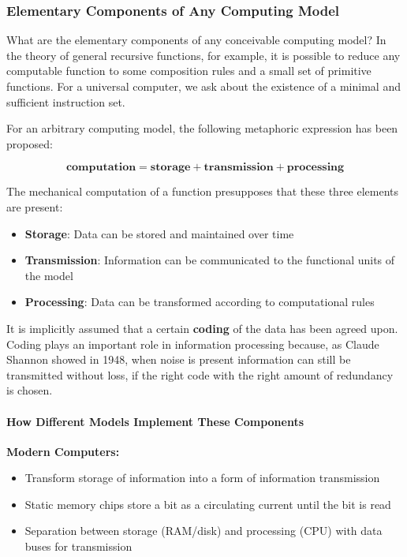 \subsubsection{Elementary Components of Any Computing Model}

What are the elementary components of any conceivable computing model? In the theory of general recursive functions, for example, it is possible to reduce any computable function to some composition rules and a small set of primitive functions. For a universal computer, we ask about the existence of a minimal and sufficient instruction set.

For an arbitrary computing model, the following metaphoric expression has been proposed:

\begin{equation}
\textbf{computation} = \textbf{storage} + \textbf{transmission} + \textbf{processing}
\end{equation}

The mechanical computation of a function presupposes that these three elements are present:

\begin{itemize}
\item \textbf{Storage}: Data can be stored and maintained over time
\item \textbf{Transmission}: Information can be communicated to the functional units of the model  
\item \textbf{Processing}: Data can be transformed according to computational rules
\end{itemize}

It is implicitly assumed that a certain \textbf{coding} of the data has been agreed upon. Coding plays an important role in information processing because, as Claude Shannon showed in 1948, when noise is present information can still be transmitted without loss, if the right code with the right amount of redundancy is chosen.

\paragraph{How Different Models Implement These Components}

\textbf{Modern Computers:}

\begin{itemize}
\item Transform storage of information into a form of information transmission
\item Static memory chips store a bit as a circulating current until the bit is read
\item Separation between storage (RAM/disk) and processing (CPU) with data buses for transmission
\end{itemize}


